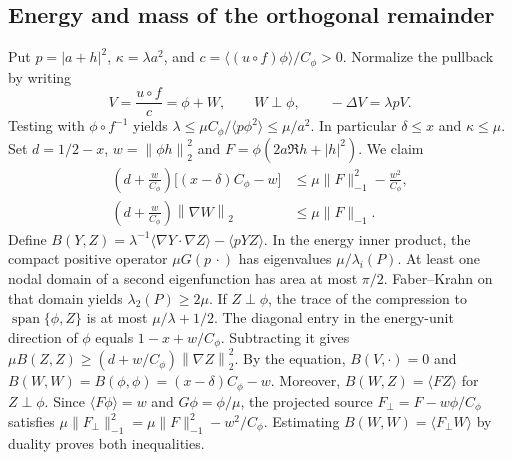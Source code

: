 \documentclass[11pt,a4paper,reqno]{amsart}
\theoremstyle{remark}
\numberwithin{equation}{section}
\newcommand{\davg}[1]{\langle #1\rangle}
\newcommand{\norm}[1]{\left\|#1\right\|_2}
\newcommand{\Cphi}{C_\phi}
\begin{document}
\subsection{Energy and mass of the orthogonal remainder}
Put $p=|a+h|^2$, $\kappa=\lambda a^2$, and
$c=\davg{(u\circ f)\phi}/\Cphi>0$. Normalize the pullback by writing
\begin{equation}\label{eq:V-pde}
  V=\frac{u\circ f}{c}=\phi+W,\qquad W\perp\phi,\qquad -\Delta V=\lambda pV.
\end{equation}
Testing with $\phi\circ f^{-1}$ yields
$\lambda\le\mu\Cphi/\davg{p\phi^2}\le\mu/a^2$. In particular
$\delta\le x$ and $\kappa\le\mu$. Set $d=1/2-x$, $w=\norm{\phi h}^2$
and $F=\phi(2a\Re h+|h|^2)$. We claim
\begin{align}
  \left(d+\frac{w}{\Cphi}\right)\bigl[(x-\delta)\Cphi-w\bigr]
    &\le\mu\|F\|_{-1}^2-\frac{w^2}{\Cphi},
    \label{eq:projected-residual}\\
  \left(d+\frac{w}{\Cphi}\right)\norm{\nabla W}
    &\le\mu\|F\|_{-1}.
    \label{eq:W-energy}
\end{align}
Define $B(Y,Z)=\lambda^{-1}\davg{\nabla Y\cdot\nabla Z}-\davg{pYZ}$.
In the energy inner product, the compact positive operator $\mu G(p\,\cdot)$
has eigenvalues $\mu/\lambda_i(P)$. At least one nodal domain of a second
eigenfunction has area at most $\pi/2$. Faber--Krahn on that domain yields
$\lambda_2(P)\ge2\mu$. If $Z\perp\phi$, the trace of the compression to
$\operatorname{span}\{\phi,Z\}$ is at most $\mu/\lambda+1/2$. The diagonal
entry in the energy-unit direction of $\phi$ equals $1-x+w/\Cphi$.
Subtracting it gives $\mu B(Z,Z)\ge(d+w/\Cphi)\norm{\nabla Z}^2$.
By the equation, $B(V,\cdot)=0$ and
$B(W,W)=B(\phi,\phi)=(x-\delta)\Cphi-w$. Moreover,
$B(W,Z)=\davg{FZ}$ for $Z\perp\phi$. Since $\davg{F\phi}=w$ and
$G\phi=\phi/\mu$, the projected source $F_\perp=F-w\phi/\Cphi$ satisfies
$\mu\|F_\perp\|_{-1}^2=\mu\|F\|_{-1}^2-w^2/\Cphi$. Estimating
$B(W,W)=\davg{F_\perp W}$ by duality proves both inequalities.
\end{document}
